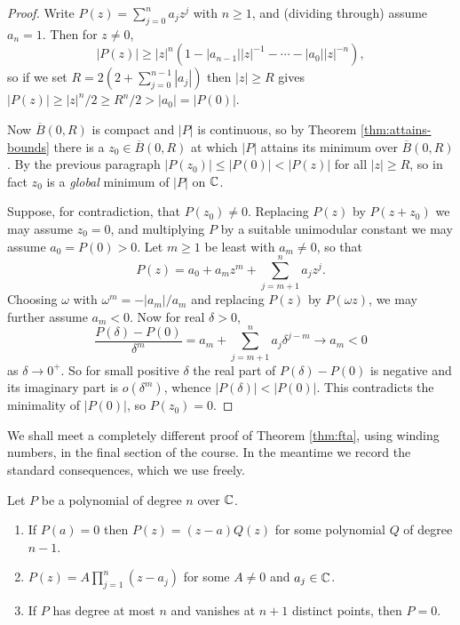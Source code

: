 \documentclass[a4paper]{scrartcl}
\begin{document}
\begin{proof}
	Write $P(z) = \sum_{j=0}^n a_j z^j$ with $n \geq 1$, and (dividing through) assume $a_n = 1$. Then for $z \neq 0$,
	$$|P(z)| \geq |z|^n\left(1 - |a_{n-1}||z|^{-1} - \cdots - |a_0||z|^{-n}\right),$$
	so if we set $R = 2\left(2 + \sum_{j=0}^{n-1}|a_j|\right)$ then $|z| \geq R$ gives $|P(z)| \geq |z|^n/2 \geq R^n /2 > |a_0| = |P(0)|$.

	Now $\overline{B}(0,R)$ is compact and $|P|$ is continuous, so by Theorem \ref{thm:attains-bounds} there is a $z_0 \in \overline{B}(0,R)$ at which $|P|$ attains its minimum over $\overline{B}(0,R)$. By the previous paragraph $|P(z_0)| \leq |P(0)| < |P(z)|$ for all $|z| \geq R$, so in fact $z_0$ is a \emph{global} minimum of $|P|$ on $\mathbb{C}$.

	Suppose, for contradiction, that $P(z_0) \neq 0$. Replacing $P(z)$ by $P(z+z_0)$ we may assume $z_0 = 0$, and multiplying $P$ by a suitable unimodular constant we may assume $a_0 = P(0) > 0$. Let $m \geq 1$ be least with $a_m \neq 0$, so that
	$$P(z) = a_0 + a_m z^m + \sum_{j = m+1}^n a_j z^j.$$
	Choosing $\omega$ with $\omega^m = -|a_m|/a_m$ and replacing $P(z)$ by $P(\omega z)$, we may further assume $a_m < 0$. Now for real $\delta > 0$,
	$$\frac{P(\delta)-P(0)}{\delta^m} = a_m + \sum_{j=m+1}^{n} a_j \delta^{j-m} \to a_m < 0$$
	as $\delta \to 0^+$. So for small positive $\delta$ the real part of $P(\delta)-P(0)$ is negative and its imaginary part is $o(\delta^m)$, whence $|P(\delta)| < |P(0)|$. This contradicts the minimality of $|P(0)|$, so $P(z_0) = 0$.
\end{proof}

We shall meet a completely different proof of Theorem \ref{thm:fta}, using winding numbers, in the final section of the course. In the meantime we record the standard consequences, which we use freely.

\begin{lemma}\label{lem:poly-roots}
	Let $P$ be a polynomial of degree $n$ over $\mathbb{C}$.
	\begin{enumerate}[label=(\roman*)]
		\item If $P(a) = 0$ then $P(z) = (z-a)Q(z)$ for some polynomial $Q$ of degree $n-1$.
		\item $P(z) = A\prod_{j=1}^n (z-a_j)$ for some $A \neq 0$ and $a_j \in \mathbb{C}$.
		\item If $P$ has degree at most $n$ and vanishes at $n+1$ distinct points, then $P = 0$.
	\end{enumerate}
\end{lemma}
\end{document}
